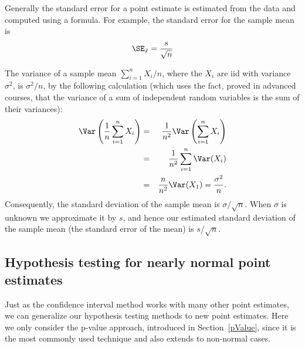 Generally the standard error for a point estimate is estimated from the data and computed using a formula. For example, the standard error for the sample mean is
\begin{eqnarray*}
\SE_{\bar{x}} = \frac{s}{\sqrt{n}}
\end{eqnarray*}

The variance of a sample mean $\sum_{i=1}^n X_i/n$, where the $X_i$ are iid with variance $\sigma^2$, is $\sigma^2/n$, by the following calculation (which uses the fact, proved in advanced courses, that the variance of a sum of independent random variables is the sum of their variances):
\begin{eqnarray*}
	\Var\left(\frac1n\sum_{i=1}^n X_i\right) &=& \frac1{n^2}\Var\left(\sum_{i=1}^n X_i\right)\\
	 &=& \frac1{n^2}\sum_{i=1}^n\Var(X_i)\\
	 &=& \frac{n}{n^2}\Var(X_1) = \frac{\sigma^2}n.
\end{eqnarray*}
Consequently, the standard deviation of the sample mean is $\sigma/\sqrt{n}$. When $\sigma$ is unknown we approximate it by $s$, and hence our estimated standard deviation of the sample mean (the standard error of the mean) is $s/\sqrt{n}$.



\subsection{Hypothesis testing for nearly normal point estimates}

Just as the confidence interval method works with many other point estimates, we can generalize our hypothesis testing methods to new point estimates. Here we only consider the p-value approach, introduced in Section~\ref{pValue}, since it is the most commonly used technique and also extends to non-normal cases.

